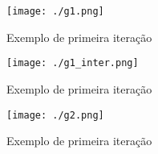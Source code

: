 \begin{frame}
	
	\begin{figure}[h]
		\begin{center}
			\texttt{[image: ./g1.png]}   
			\caption{Exemplo de primeira iteração}
			\label{fig:g1}
		\end{center}
	\end{figure}
	
	
\end{frame}

\begin{frame}
	
	\begin{figure}[h]
		\begin{center}
			\texttt{[image: ./g1\_inter.png]}   
			\caption{Exemplo de primeira iteração}
			\label{fig:g1_inter}
		\end{center}
	\end{figure}
	
	
\end{frame}

\begin{frame}
	
	\begin{figure}[h]
		\begin{center}
			\texttt{[image: ./g2.png]}   
			\caption{Exemplo de primeira iteração}
			\label{fig:g2}
		\end{center}
	\end{figure}
	
	
\end{frame}
	
	

